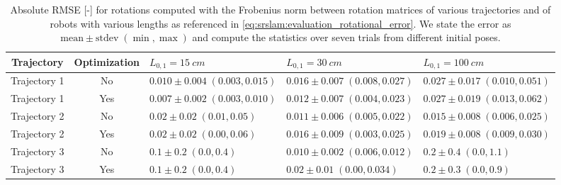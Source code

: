 \iffalse
\begin{table}\small
\centering
\caption{Absolute \gls{RMSE} [-] for rotations computed with the Frobenius norm between rotation matrices of various trajectories and of robots with various lengths as referenced in \eqref{eq:srslam:evaluation_rotational_error}. We state the error as $\text{mean} \pm \text{stdev} \; (\min, \max)$ and compute the statistics over seven trials from different initial poses.}
\begin{tabular}{cclll}\toprule
\textbf{Trajectory} & \textbf{Optimization} & $L_{0,1} = \SI{15}{cm}$ & $L_{0,1} = \SI{30}{cm}$ & $L_{0,1} = \SI{100}{cm}$\\
\midrule
    Trajectory 1 & No & $0.010 \pm 0.004 \; (0.003, 0.015)$ & $0.016 \pm 0.007 \; (0.008, 0.027)$ & $0.027 \pm 0.017 \; (0.010, 0.051)$ \\
    Trajectory 1 & Yes & $0.007 \pm 0.002 \; (0.003, 0.010)$ & $0.012 \pm 0.007 \; (0.004, 0.023)$ & $0.027 \pm 0.019 \; (0.013, 0.062)$ \\
    \midrule
    Trajectory 2 & No & $0.02 \pm 0.02 \; (0.01, 0.05)$ & $0.011 \pm 0.006 \; (0.005, 0.022)$ & $0.015 \pm 0.008 \; (0.006, 0.025)$ \\
    Trajectory 2 & Yes & $0.02 \pm 0.02 \; (0.00, 0.06)$ & $0.016 \pm 0.009 \; (0.003, 0.025)$ & $0.019 \pm 0.008 \; (0.009, 0.030)$ \\
    \midrule
    Trajectory 3 & No & $0.1 \pm 0.2 \; (0.0, 0.4)$ & $0.010 \pm 0.002 \; (0.006, 0.012)$ & $0.2 \pm 0.4 \; (0.0, 1.1)$ \\
    Trajectory 3 & Yes & $0.1 \pm 0.2 \; (0.0, 0.4)$ & $0.02 \pm 0.01 \; (0.00, 0.034)$ & $0.2 \pm 0.3 \; (0.0, 0.9)$ \\
\bottomrule
\end{tabular}
\label{tab:srslam:results_simulations_rotation_frobenius}
\end{table}

